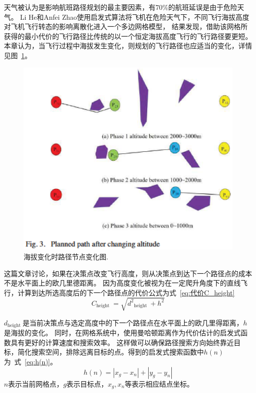 \documentclass[12pt,a4paper,UTF8]{ctexart}
\begin{document}
天气被认为是影响航班路径规划的最主要因素，有70\%的航班延误是由于危险天气\cite{Narkawicz2016}。
Li He和Anfei Zhao\cite{hePathPlanningMethod2019}使用启发式算法将飞机在危险天气下，不同飞行海拔高度对飞机飞行转态的影响离散化进入一个多边网格模型，
结果发现，借助该网格所获得的最小代价的飞行路径比传统的以一个恒定海拔高度飞行的飞行路径要更短。
本章认为，当飞行过程中海拔发生变化，则规划的飞行路径也应适当的变化，详情见图~\ref{fig:path plan change }。
\begin{figure}[htbp]
    \centering
    \includegraphics[width=12cm]{allpicture/altitude_change.eps}
    \caption{海拔变化时路径节点变化图.}
    \label{fig:path plan change }
\end{figure}

这篇文章讨论，如果在决策点改变飞行高度，则从决策点到达下一个路径点的成本不是水平面上的欧几里德距离。
因为高度变化被视为在一定爬升角度下的直线飞行，计算到达所选高度后的下一个路径点的代价公式为式~\ref{eq:代价C_height}
\begin{equation}
    C_{\text {height }}=\sqrt{d^2{ }_{\text {height }}+h^2}
    \label{eq:代价C_height}
\end{equation}

$ d_{\text {height }} $是当前决策点与选定高度中的下一个路径点在水平面上的欧几里得距离，$ h $是海拔的变化。
同时，在网格系统中，使用曼哈顿距离作为代价估计的启发式函数具有更好的计算速度和搜索效率\cite{grecheComparisonEuclideanManhattan2017}。
这样做可以确保路径搜索方向始终靠近目标，简化搜索空间，排除远离目标的点。得到的启发式搜索函数中$ h(n) $为~式~\ref{eq:h(n)}。
\begin{equation}
    h(n)=\left|x_g-x_n\right|+\left|y_g-y_n\right|
    \label{eq:h(n)}
\end{equation}
$ n $表示当前网格点，$ g $表示目标点，$ x_g, x_n$等表示相应结点坐标。
\end{document}
